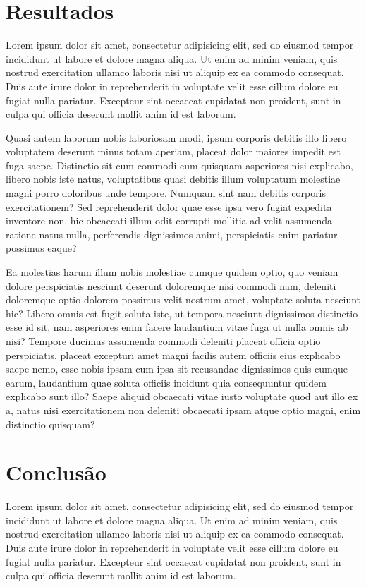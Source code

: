 \documentclass[
    12pt,               %
    openright,          %
    twoside,            %
    a4paper,            %
    chapter=TITLE,     %
    english,            %
    spanish,            %
    portuguese              %
    ]{abntex2}
\begin{document}
\chapter{Resultados}

Lorem ipsum dolor sit amet, consectetur adipisicing elit, sed do eiusmod tempor incididunt ut labore et dolore magna aliqua. Ut enim ad minim veniam, quis nostrud exercitation ullamco laboris nisi ut aliquip ex ea commodo consequat. Duis aute irure dolor in reprehenderit in voluptate velit esse cillum dolore eu fugiat nulla pariatur. Excepteur sint occaecat cupidatat non proident, sunt in culpa qui officia deserunt mollit anim id est laborum.


Quasi autem laborum nobis laboriosam modi, ipsum corporis debitis illo libero voluptatem deserunt minus totam aperiam, placeat dolor maiores impedit est fuga saepe. Distinctio sit cum commodi eum quisquam asperiores nisi explicabo, libero nobis iste natus, voluptatibus quasi debitis illum voluptatum molestiae magni porro doloribus unde tempore. Numquam sint nam debitis corporis exercitationem? Sed reprehenderit dolor quae esse ipsa vero fugiat expedita inventore non, hic obcaecati illum odit corrupti mollitia ad velit assumenda ratione natus nulla, perferendis dignissimos animi, perspiciatis enim pariatur possimus eaque?


Ea molestias harum illum nobis molestiae cumque quidem optio, quo veniam dolore perspiciatis nesciunt deserunt doloremque nisi commodi nam, deleniti doloremque optio dolorem possimus velit nostrum amet, voluptate soluta nesciunt hic? Libero omnis est fugit soluta iste, ut tempora nesciunt dignissimos distinctio esse id sit, nam asperiores enim facere laudantium vitae fuga ut nulla omnis ab nisi? Tempore ducimus assumenda commodi deleniti placeat officia optio perspiciatis, placeat excepturi amet magni facilis autem officiis eius explicabo saepe nemo, esse nobis ipsam cum ipsa sit recusandae dignissimos quis cumque earum, laudantium quae soluta officiis incidunt quia consequuntur quidem explicabo sunt illo? Saepe aliquid obcaecati vitae iusto voluptate quod aut illo ex a, natus nisi exercitationem non deleniti obcaecati ipsam atque optio magni, enim distinctio quisquam?



\chapter{Conclusão}

Lorem ipsum dolor sit amet, consectetur adipisicing elit, sed do eiusmod tempor incididunt ut labore et dolore magna aliqua. Ut enim ad minim veniam, quis nostrud exercitation ullamco laboris nisi ut aliquip ex ea commodo consequat. Duis aute irure dolor in reprehenderit in voluptate velit esse cillum dolore eu fugiat nulla pariatur. Excepteur sint occaecat cupidatat non proident, sunt in culpa qui officia deserunt mollit anim id est laborum.
\end{document}
